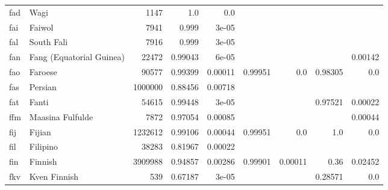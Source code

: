 \documentclass[11pt]{article}
\begin{document}
\begin{table*}[h]
{\begin{tabular}{llrrrrrrr}
fad         & Wagi         & 1147         & 1.0         & 0.0         &          &          &          &          \\

fai         & Faiwol         & 7941         & 0.999         & 3e-05         &          &          &          &          \\

fal         & South Fali         & 7916         & 0.999         & 3e-05         &          &          &          &          \\

fan         & Fang (Equatorial Guinea)         & 22472         & 0.99043         & 6e-05         &          &          &          & 0.00142         \\

fao         & Faroese         & 90577         & 0.99399         & 0.00011         & 0.99951         & 0.0         & 0.98305         & 0.0         \\

fas         & Persian         & 1000000         & 0.88456         & 0.00718         &          &          &          &          \\

fat         & Fanti         & 54615         & 0.99448         & 3e-05         &          &          & 0.97521         & 0.00022         \\

ffm         & Maasina Fulfulde         & 7872         & 0.97054         & 0.00085         &          &          &          & 0.00044         \\

fij         & Fijian         & 1232612         & 0.99106         & 0.00044         & 0.99951         & 0.0         & 1.0         & 0.0         \\

fil         & Filipino         & 38283         & 0.81967         & 0.00022         &          &          &          &          \\

fin         & Finnish         & 3909988         & 0.94857         & 0.00286         & 0.99901         & 0.00011         & 0.36         & 0.02452         \\

fkv         & Kven Finnish         & 539         & 0.67187         & 3e-05         &          &          & 0.28571         & 0.0         \\


\end{tabular}}
\end{table*}
\end{document}
